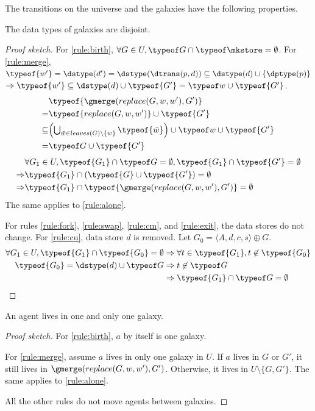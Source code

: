 The transitions on the universe and the galaxies have the following properties. 

\begin{proposition}
The data types of galaxies are disjoint.
\end{proposition}
\begin{proof}[Proof sketch]
For \ref{rule:birth}, $\forall G\in U, \typeof G \cap \typeof\mkstore = \emptyset$.
%
For \ref{rule:merge}, %
$\typeof{w'}=\dstype(d')=\dstype(\dtrans(p,d))\subseteq\dstype(d)\cup\{\dptype(p)\}$
$\Rightarrow \typeof{w'}\subseteq\dstype(d)\cup\typeof{G'}=\typeof w\cup\typeof{G'}$. 
\begin{align*}
    & \typeof{\gmerge(replace(G,w,w'),G')} \\
  = & \typeof{replace(G,w,w')}\cup\typeof{G'} \\
  \subseteq & {\textstyle\left(\bigcup_{\tilde w \in leaves(G)\setminus\{w\}} \typeof{\tilde w}\right)} \cup \typeof w\cup\typeof{G'} \\
  = & \typeof G \cup \typeof{G'}
\end{align*}
\begin{align*}
  & \forall G_1\in U, \typeof{G_1}\cap\typeof G=\emptyset, \typeof{G_1}\cap\typeof{G'}=\emptyset  \\
  \Rightarrow & \typeof{G_1} \cap (\typeof{G}\cup\typeof{G'}) = \emptyset \\
  \Rightarrow & \typeof{G_1} \cap \typeof{\gmerge(replace(G,w,w'),G')} = \emptyset
\end{align*}
The same applies to \ref{rule:alone}. 

For rules \ref{rule:fork}, \ref{rule:swap}, \ref{rule:cm}, and \ref{rule:exit}, 
the data stores do not change. 
%
For \ref{rule:cu}, data store $d$ is removed. 
Let $G_0=\langle A,d,c,s\rangle\oplus G$.
\begin{align*}
  \forall G_1\in U, \typeof{G_1}\cap\typeof{G_0}=\emptyset
  & \Rightarrow \forall t\in\typeof{G_1}, t\not\in\typeof{G_0} \\
  \typeof{G_0}=\dstype(d)\cup\typeof G
  & \Rightarrow t\not\in\typeof G \\
  & \Rightarrow \typeof{G_1}\cap\typeof G=\emptyset
\end{align*}
\end{proof}

\begin{proposition}
An agent lives in one and only one galaxy.
\end{proposition}
\begin{proof}[Proof sketch]
For \ref{rule:birth}, $a$ by itself is one galaxy.

For \ref{rule:merge}, assume $a$ lives in only one galaxy in $U$. 
If $a$ lives in $G$ or $G'$, it still lives in $\gmerge(replace(G,w,w'),G')$.
Otherwise, it lives in $U\setminus\{G,G'\}$.
The same applies to \ref{rule:alone}. 

All the other rules do not move agents between galaxies. 
\end{proof}

